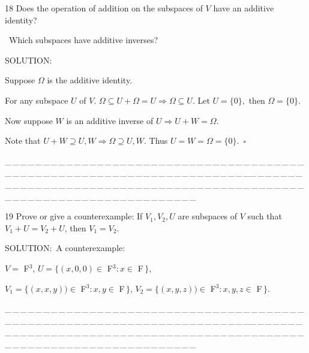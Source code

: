 \documentclass[a4paper, 11pt, UTF8]{article}
\begin{document}
\begin{large}
{\timesbf\Large 18} {\timessl\Large 
Does the operation of addition on the subspaces of $V$ have an additive identity?}\par\quad\,
{\timessl\Large Which subspaces have additive inverses?}\par
{\timesbf S\footnotesize{OLUTION:}}\par\quad
Suppose $\Omega$ is the additive identity.\par\quad
For any subspace $U$ of $V$. $\Omega\subseteq U+\Omega=U\Rightarrow\Omega\subseteq U$. Let $U=\{0\},$ then $\Omega=\{0\}.$\par\quad
Now suppose $W$ is an additive inverse of $U\Rightarrow U+W=\Omega$.\par\quad
Note that $U+W\supseteq U,W\Rightarrow \Omega\supseteq U,W$. Thus $U=W=\Omega=\{0\}.\,\,\,\square$\par
{\tiny \_\,\_\,\_\,\_\,\_\,\_\,\_\,\_\,\_\,\_\,\_\,\_\,\_\,\_\,\_\,\_\,\_\,\_\,\_\,\_\,\_\,\_\,\_\,\_\,\_\,\_\,\_\,\_\,\_\,\_\,\_\,\_\,\_\,\_\,\_\,\_\,\_\,\_\,\_\,\_\,\_\,\_\,\_\,\_\,\_\,\_\,\_\,\_\,\_\,\_\,\_\,\_\,\_\,\_\,\_\,\_\,\_\,\_\,\_\,\_\,\_\,\_\,\_\,\_\,\_\,\_\,\_\,\_\,\_\,\_\,\_\_\,\_\,\_\,\_\,\_\,\_\,\_\,\_\,\_\,\_\,\_\,\_\,\_\,\_\,\_\,\_\,\_\,\_\,\_\,\_\,\_\,\_\,\_\,\_\,\_\,\_\,\_\,\_\,\_\,\_\,\_\,\_\,\_\,\_\,\_\,\_\,\_\,\_\,\_\,\_\,\_\,\_\,\_\,\_\,\_\,\_\,\_\,\_\,\_\,\_\,\_\,\_\,\_\,\_\,\_\,\_\,\_\,\_\,\_\,\_\,\_\,\_\,\_\,\_\,\_\,\_\,\_\,\_\,\_\,\_\,\_}\par

{\timesbf\Large 19} {\timessl\Large 
Prove or give a counterexample: If $V_1,V_2,U$ are subspaces of $V$ such that $V_1+U=V_2+U$, then $V_1=V_2$.
}\par
{\timesbf S\footnotesize{OLUTION:}}\,\,\,A counterexample:\par\quad
$V=$ {\timesbf F}$^3$, $U=\{(x,0,0)\in$ {\timesbf F}$^3:x\in$ {\timesbf F}$\,\}$,\par\quad
$V_1=\{(x,x,y))\in$ {\timesbf F}$^3:x,y\in$ {\timesbf F}$\,\}$, $V_2=\{(x,y,z))\in$ {\timesbf F}$^3:x,y,z\in$ {\timesbf F}$\,\}$.
\par
{\tiny \_\,\_\,\_\,\_\,\_\,\_\,\_\,\_\,\_\,\_\,\_\,\_\,\_\,\_\,\_\,\_\,\_\,\_\,\_\,\_\,\_\,\_\,\_\,\_\,\_\,\_\,\_\,\_\,\_\,\_\,\_\,\_\,\_\,\_\,\_\,\_\,\_\,\_\,\_\,\_\,\_\,\_\,\_\,\_\,\_\,\_\,\_\,\_\,\_\,\_\,\_\,\_\,\_\,\_\,\_\,\_\,\_\,\_\,\_\,\_\,\_\,\_\,\_\,\_\,\_\,\_\,\_\,\_\,\_\,\_\,\_\_\,\_\,\_\,\_\,\_\,\_\,\_\,\_\,\_\,\_\,\_\,\_\,\_\,\_\,\_\,\_\,\_\,\_\,\_\,\_\,\_\,\_\,\_\,\_\,\_\,\_\,\_\,\_\,\_\,\_\,\_\,\_\,\_\,\_\,\_\,\_\,\_\,\_\,\_\,\_\,\_\,\_\,\_\,\_\,\_\,\_\,\_\,\_\,\_\,\_\,\_\,\_\,\_\,\_\,\_\,\_\,\_\,\_\,\_\,\_\,\_\,\_\,\_\,\_\,\_\,\_\,\_\,\_\,\_\,\_\,\_}{\tiny\,\par}{\,\par}\,\par


\end{large}
\end{document}
